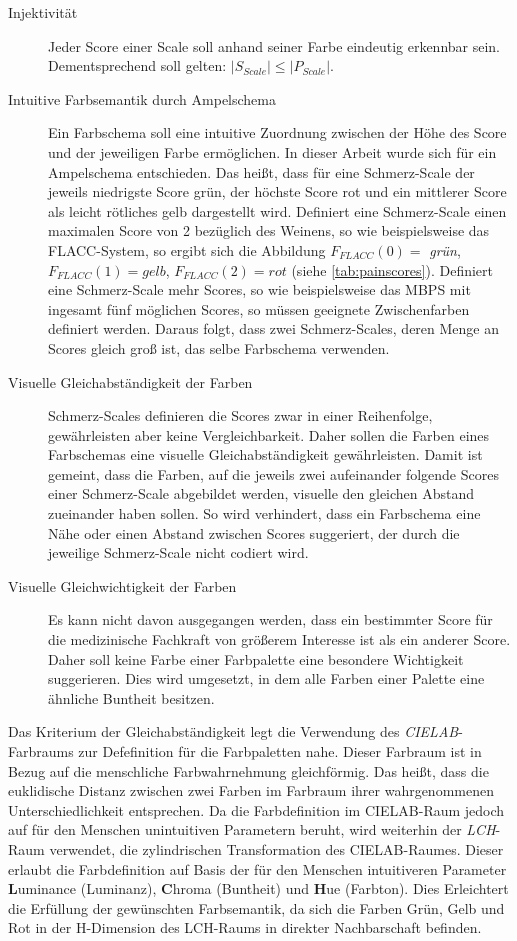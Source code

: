 \begin{description}
\item[Injektivität] Jeder Score einer Scale soll anhand seiner Farbe eindeutig erkennbar sein. Dementsprechend soll gelten: $|S_{Scale}| \leq |P_{Scale}|$.
\item[Intuitive Farbsemantik durch Ampelschema] Ein Farbschema soll eine intuitive Zuordnung zwischen der Höhe des Score und der jeweiligen Farbe ermöglichen. In dieser Arbeit wurde sich für ein Ampelschema entschieden. Das heißt, dass für eine Schmerz-Scale der jeweils niedrigste Score \glqq grün\grqq{}, der höchste Score \glqq rot\grqq{} und ein \glqq mittlerer\grqq{} Score als \glqq leicht rötliches gelb\grqq{} dargestellt wird. Definiert eine Schmerz-Scale einen maximalen Score von 2 bezüglich des Weinens, so wie beispielsweise das FLACC-System, so ergibt sich die Abbildung $F_{FLACC}(0) = $ \emph{grün}, $F_{FLACC}(1) = gelb$, $F_{FLACC}(2) = rot$ (siehe \autoref{tab:painscores}). Definiert eine Schmerz-Scale mehr Scores, so wie beispielsweise das MBPS mit ingesamt fünf möglichen Scores, so müssen geeignete Zwischenfarben definiert werden. Daraus folgt, dass zwei Schmerz-Scales, deren Menge an Scores gleich groß ist, das selbe Farbschema verwenden.
\item[Visuelle Gleichabständigkeit der Farben] Schmerz-Scales definieren die Scores zwar in einer Reihenfolge, gewährleisten aber keine Vergleichbarkeit. Daher sollen die Farben eines Farbschemas eine \glqq visuelle Gleichabständigkeit\grqq{} gewährleisten. Damit ist gemeint, dass die Farben, auf die jeweils zwei aufeinander folgende Scores einer Schmerz-Scale abgebildet werden, visuelle den gleichen Abstand zueinander haben sollen. So wird verhindert, dass ein Farbschema eine Nähe oder einen Abstand zwischen Scores suggeriert, der durch die jeweilige Schmerz-Scale nicht codiert wird. 
\item[Visuelle Gleichwichtigkeit der Farben] Es kann nicht davon ausgegangen werden, dass ein bestimmter Score für die medizinische Fachkraft von größerem Interesse ist als ein anderer Score. Daher soll keine Farbe einer Farbpalette eine besondere Wichtigkeit suggerieren. Dies wird umgesetzt, in dem alle Farben einer Palette eine ähnliche Buntheit besitzen.\cite{bigman}
\end{description}

Das Kriterium der Gleichabständigkeit legt die Verwendung des \emph{CIELAB}-Farbraums zur Defefinition für die Farbpaletten nahe. Dieser Farbraum ist in Bezug auf die menschliche Farbwahrnehmung \glqq gleichförmig\grqq. Das heißt, dass die euklidische Distanz zwischen zwei Farben im Farbraum ihrer wahrgenommenen Unterschiedlichkeit entsprechen. Da die Farbdefinition im CIELAB-Raum jedoch auf für den Menschen unintuitiven Parametern beruht, wird weiterhin der \emph{LCH}-Raum verwendet, die zylindrischen Transformation des CIELAB-Raumes. Dieser erlaubt die Farbdefinition auf Basis der für den Menschen intuitiveren Parameter \textbf{L}uminance (Luminanz), \textbf{C}hroma (Buntheit) und \textbf{H}ue (Farbton). Dies Erleichtert die Erfüllung der gewünschten Farbsemantik, da sich die Farben Grün, Gelb und Rot in der H-Dimension des LCH-Raums in direkter Nachbarschaft befinden.\cite[S. 2-3]{palettes}\cite{johnstone}

